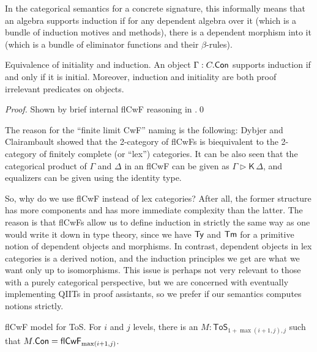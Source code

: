 \documentclass{llncs}
\newcommand{\ToS}{\mathsf{ToS}}
\newcommand{\ext}{\triangleright}
\newcommand{\flCwF}{\mathsf{flCwF}}
\newcommand{\Kfam}{\mathsf{K}}
\begin{document}
In the categorical semantics for a concrete signature, this informally means
that an algebra supports induction if for any dependent algebra over it (which
is a bundle of induction motives and methods), there is a dependent morphism
into it (which is a bundle of eliminator functions and their $\beta$-rules).

\begin{theorem}{Equivalence of initiality and induction.}
An object $\Gamma : C.\mathsf{Con}$ supports induction if and only if it is
initial. Moreover, induction and initiality are both proof irrelevant
predicates on objects.
\end{theorem}
\begin{proof} Shown by brief internal flCwF reasoning in \cite{TODO}.\qed
\end{proof}

The reason for the ``finite limit CwF'' naming is the following: Dybjer and
Clairambault showed\cite{TODO} that the 2-category of flCwFs is biequivalent to
the 2-category of finitely complete (or ``lex'') categories. It can be also seen
that the categorical product of $\Gamma$ and $\Delta$ in an flCwF can be given
as $\Gamma \ext \Kfam\, \Delta$, and equalizers can be given using the identity
type.

So, why do we use flCwF instead of lex categories? After all, the former
structure has more components and has more immediate complexity than the
latter. The reason is that flCwFs allow us to define induction in strictly the
same way as one would write it down in type theory, since we have $\mathsf{Ty}$ and
$\mathsf{Tm}$ for a primitive notion of dependent objects and morphisms. In contrast,
dependent objects in lex categories is a derived notion, and the induction
principles we get are what we want only up to isomorphisms. This issue is
perhaps not very relevant to those with a purely categorical perspective, but we
are concerned with eventually implementing QIITs in proof assistants, so we
prefer if our semantics computes notions strictly.


\begin{nidefinition}{flCwF model for ToS.} For $i$ and $j$ levels, there is
an $M : \ToS_{1+\max(i+1,j),j}$ such that $M.\Con = \flCwF_{\max(i+1,j)}$.




\end{nidefinition}
\end{document}
